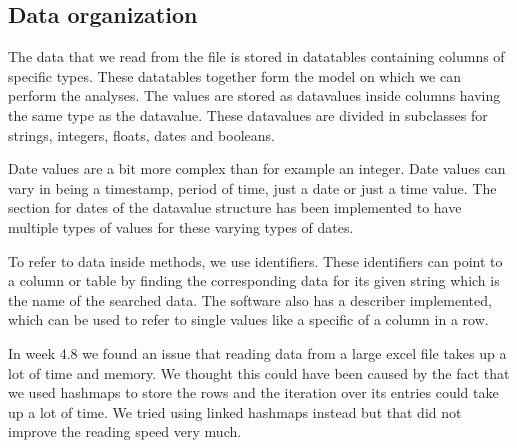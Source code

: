 \documentclass[a4paper]{article}
\begin{document}
\subsection{Data organization}
The data that we read from the file is stored in datatables containing columns of specific types. These datatables together form the model on which we can perform the analyses. The values are stored as datavalues inside columns having the same type as the datavalue. These datavalues are divided in subclasses for strings, integers, floats, dates and booleans.

Date values are a bit more complex than for example an integer. Date values can vary in being a timestamp, period of time, just a date or just a time value. The section for dates of the datavalue structure has been implemented to have multiple types of values for these varying types of dates.

To refer to data inside methods, we use identifiers. These identifiers can point to a column or table by finding the corresponding data for its given string which is the name of the searched data. The software also has a describer implemented, which can be used to refer to single values like a specific of a column in a row. 

In week 4.8 we found an issue that reading data from a large excel file takes up a lot of time and memory. We thought this could have been caused by the fact that we used hashmaps to store the rows and the iteration over its entries could take up a lot of time. We tried using linked hashmaps instead but that did not improve the reading speed very much.
\end{document}
